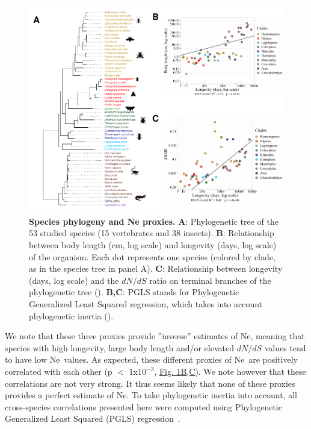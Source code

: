 \begin{figure}[t]   
    \begin{center}                                                                       
        \includegraphics[width=\textwidth] {Figure1.pdf}
    \end{center}                                                                       
    \caption[Species phylogeny and \Ne~proxies]{\textbf{Species phylogeny and \acrshort{Ne} proxies.} \textbf{A}: Phylogenetic tree of the 53 studied species (15 vertebrates and 38 insects). \textbf{B}: Relationship between body length (cm, log scale) and longevity (days, log scale) of the organism. Each dot represents one species (colored by clade, as in the species tree in panel A). \textbf{C}: Relationship between longevity (days, log scale) and the ${dN}/{dS}$ ratio on terminal branches of the phylogenetic tree ().
   \textbf{B,C}: PGLS stands for Phylogenetic Generalized Least Squared regression, which takes into account phylogenetic inertia ().
    \newline}
    \label{fig:AS1}
\end{figure}

We note that these three proxies provide ”inverse” estimates of \acrshort{Ne}, meaning that species with high longevity, large body length and/or elevated ${dN}/{dS}$ values tend to have low \acrshort{Ne}~values. As expected, these different proxies of \acrshort{Ne}~are positively correlated with each other (p $<$ 1x$10^{-3}$, \hyperref[fig:AS1]{Fig. 1B,C}). We note however that these correlations are not very strong. It thus seems likely that none of these proxies provides a perfect estimate of \acrshort{Ne}. To take phylogenetic inertia into account, all cross-species correlations presented here were computed using Phylogenetic Generalized Least Squared (PGLS) regression~\citep{freckleton_phylogenetic_2002}.

